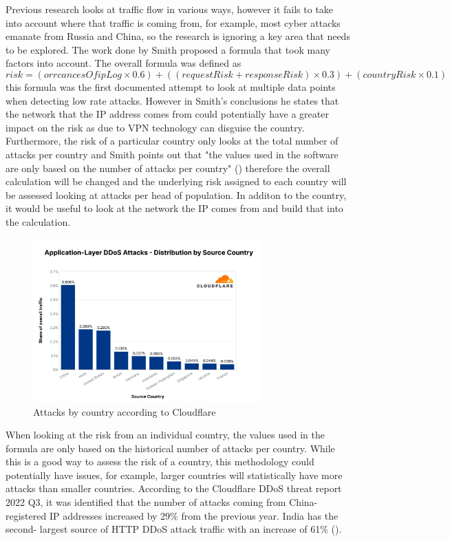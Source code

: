 Previous research looks at traffic flow in various ways, however it fails to take into account where that traffic is coming from, for example, most cyber attacks emanate from Russia and China, so the research is ignoring a key area that needs to be explored. The work done by Smith proposed a formula that took many factors  into account. The overall formula was defined as  \[risk = (orrcancesOfipLog \times 0.6) + ((requestRisk+responseRisk) \times 0.3) + (countryRisk \times  0.1) \] this formula was the first documented  attempt to look at multiple data points when detecting low rate attacks. However in Smith's conclusions he states that the network that the IP address comes from could potentially have a greater impact on the risk as due to VPN technology can disguise the country. Furthermore, the risk of a particular country only looks at the total number of attacks per country and Smith points out that  "the values used in the software are only based on the number of attacks per country" (\cite{smith}) therefore the overall calculation will be changed and the underlying risk assigned to each country will be assessed looking at attacks per head of population. In additon to the country, it would be useful to look at the network the IP comes from and build that into the calculation. 

\begin{figure}
\label{web using h2}
    \includegraphics[width=88mm,scale=0.4]{images/CF q3.png} 
    \caption{Attacks by country according to Cloudflare}
\end{figure}
When looking at the risk from an individual country, the values used in the formula are only based on the historical number of attacks per country. While this is a good way to assess the risk of a country, this methodology could potentially have issues, for example, larger countries will statistically have more attacks than smaller countries. According to the Cloudflare DDoS threat report 2022 Q3, it was identified that the number of attacks coming from China- registered IP addresses increased by 29\% from the previous year. India has the second- largest source of HTTP DDoS attack traffic with an increase of 61\% (\cite{Q3attacks}).

